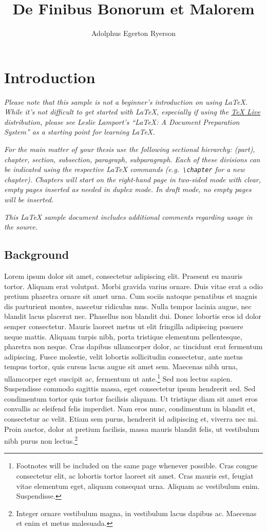 \documentclass[final,los,index,glossary,loa]{ryethesis}
\author{Adolphus Egerton Ryerson}
\title{De Finibus Bonorum et Malorem}
\begin{document}
\chapter{Introduction}
\textit{Please note that this sample is not a beginner's introduction on using \LaTeX{}. While it's not difficult to get started with \LaTeX{}, especially if using the \href{http://tug.org/texlive}{\TeX{} Live} distribution, please see Leslie Lamport's ``LaTeX: A Document Preparation System'' as a starting point for learning \LaTeX{}.}

\textit{For the main matter of your thesis use the following sectional hierarchy: (part), chapter, section, subsection, paragraph, subparagraph. Each of these divisions can be indicated using the respective \LaTeX{} commands (e.g.\ \texttt{\textbackslash{chapter}} for a new chapter). Chapters will start on the right-hand page in two-sided mode with clear, empty pages inserted as needed in duplex mode. In draft mode, no empty pages will be inserted.}

\textit{This \LaTeX{} sample document includes additional comments regarding usage in the source.}

\section{Background}
\Gls{Lorem} ipsum dolor sit amet, consectetur adipiscing elit. Praesent eu mauris tortor. Aliquam erat volutpat. Morbi gravida varius ornare. Duis vitae erat a odio pretium pharetra ornare sit amet urna. Cum sociis natoque penatibus et magnis dis parturient montes, nascetur ridiculus mus. Nulla tempor lacinia augue, nec blandit lacus placerat nec. Phasellus non blandit dui. Donec lobortis eros id dolor semper consectetur. Mauris laoreet metus ut elit fringilla adipiscing posuere neque mattis. Aliquam turpis nibh, porta tristique elementum pellentesque, pharetra non neque. Cras dapibus ullamcorper dolor, ac tincidunt erat fermentum adipiscing. Fusce molestie, velit lobortis sollicitudin consectetur, ante metus tempus tortor, quis cursus lacus augue sit amet sem. Maecenas nibh urna, ullamcorper eget suscipit ac, fermentum ut ante.\footnote{Footnotes will be included on the same page whenever possible. Cras congue consectetur elit, ac lobortis tortor laoreet sit amet. Cras mauris est, feugiat vitae elementum eget, aliquam consequat urna. Aliquam ac vestibulum enim. Suspendisse.} Sed non lectus sapien. Suspendisse commodo sagittis massa, eget consectetur ipsum hendrerit sed. Sed condimentum tortor quis tortor facilisis aliquam. Ut tristique diam sit amet eros convallis ac eleifend felis imperdiet. Nam eros nunc, condimentum in blandit et, consectetur ac velit. Etiam sem purus, hendrerit id adipiscing et, viverra nec mi. Proin auctor, dolor at pretium facilisis, massa mauris blandit felis, ut vestibulum nibh purus non lectus.\footnote{Integer ornare vestibulum magna, in vestibulum lacus dapibus ac. Maecenas et enim et metus malesuada.}
\end{document}
